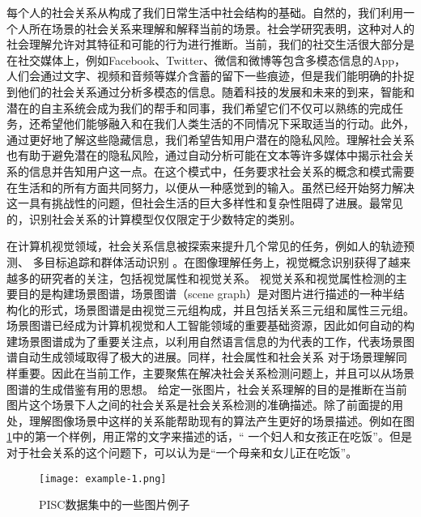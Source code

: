 每个人的社会关系从构成了我们日常生活中社会结构的基础。自然的，我们利用一个人所在场景的社会关系来理解和解释当前的场景。社会学研究表明，这种对人的社会理解允许对其特征和可能的行为进行推断。当前，我们的社交生活很大部分是在社交媒体上，例如Facebook、Twitter、微信和微博等包含多模态信息的App，人们会通过文字、视频和音频等媒介含蓄的留下一些痕迹，但是我们能明确的扑捉到他们的社会关系通过分析多模态的信息。随着科技的发展和未来的到来，智能和潜在的自主系统会成为我们的帮手和同事，我们希望它们不仅可以熟练的完成任务，还希望他们能够融入和在我们人类生活的不同情况下采取适当的行动。此外，通过更好地了解这些隐藏信息，我们希望告知用户潜在的隐私风险。理解社会关系也有助于避免潜在的隐私风险，通过自动分析可能在文本等许多媒体中揭示社会关系的信息并告知用户这一点。在这个模式中，任务要求社会关系的概念和模式需要在生活和的所有方面共同努力，以便从一种感觉到的输入。虽然已经开始努力解决这一具有挑战性的问题，但社会生活的巨大多样性和复杂性阻碍了进展。最常见的，识别社会关系的计算模型仅仅限定于少数特定的类别。

在计算机视觉领域，社会关系信息被探索来提升几个常见的任务，例如人的轨迹预测\cite{kim2015brvo,robicquet2016learning}、 多目标追踪\cite{chen2012discovering,qin2012improving}和群体活动识别
\cite{direkoglu2012team,lan2012social,lan2012discriminative}。在图像理解任务上，视觉概念识别获得了越来越多的研究者的关注，包括视觉属性和视觉关系\cite{lu2016visual}。
视觉关系和视觉属性检测的主要目的是构建场景图谱，场景图谱（scene graph）\cite{johnson2015image}是对图片进行描述的一种半结构化的形式，场景图谱是由视觉三元组构成，并且包括关系三元组和属性三元组。场景图谱已经成为计算机视觉和人工智能领域的重要基础资源，因此如何自动的构建场景图谱成为了重要关注点，以利用自然语言信息的\cite{lu2016visual}为代表的工作，代表场景图谱自动生成领域取得了极大的进展。同样，社会属性和社会关系\cite{wang2010seeing} 对于场景理解同样重要。因此在当前工作，主要聚焦在解决社会关系检测问题上，并且可以从场景图谱的生成借鉴有用的思想。
给定一张图片，社会关系理解的目的是推断在当前图片这个场景下人之间的社会关系是社会关系检测的准确描述。除了前面提的用处，理解图像场景中这样的关系能帮助现有的算法产生更好的场景描述。例如在图\ref{fig:intro-example}中的第一个样例，用正常的文字来描述的话，`` 一个妇人和女孩正在吃饭''。但是对于社会关系的这个问题下，可以认为是``一个母亲和女儿正在吃饭''。
\begin{figure}[htpb]
	\centering
	\texttt{[image: example-1.png]}
    \caption{PISC数据集中的一些图片例子}
	\vspace*{-3.5mm}
	\label{fig:intro-example}
\end{figure}

